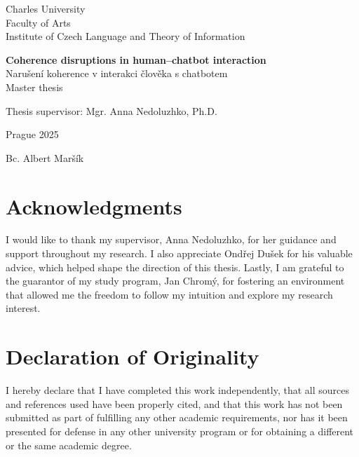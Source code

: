 \documentclass[12pt]{report}
\begin{document}
\thispagestyle{empty}

\begin{center}
    Charles University\\
    Faculty of Arts\\
    Institute of Czech Language and Theory of Information
\end{center}

\vfill

\begin{center}
    \textbf{\Large Coherence disruptions in human–chatbot interaction}\\
    Narušení koherence v interakci člověka s chatbotem\\[1cm]
    Master thesis
\end{center}

\vfill
\begin{flushleft}
    Thesis supervisor: Mgr. Anna Nedoluzhko, Ph.D.
\end{flushleft}


\noindent
\begin{minipage}{0.5\textwidth}
    Prague 2025
\end{minipage}%
\hfill
\begin{minipage}{0.4\textwidth}
    \raggedleft Bc. Albert Maršík
\end{minipage}

\newpage
\thispagestyle{empty}
\mbox{}
\newpage
\thispagestyle{empty}


   \vbox{}
   \vfill
   \section*{Acknowledgments}
   I would like to thank my supervisor, Anna Nedoluzhko, for her guidance and support throughout my research.
   I also appreciate Ondřej Dušek for his valuable advice,
   which helped shape the direction of this thesis.
   Lastly, I am grateful to the guarantor of my study program, Jan Chromý,
   for fostering an environment that allowed me the freedom to follow my intuition and explore my research interest.
   \newpage
   \thispagestyle{empty}

   \vbox{}
   \vfill
   \section*{Declaration of Originality}
   I hereby declare that I have completed this work independently,
   that all sources and references used have been properly cited,
   and that this work has not been submitted as part of fulfilling any other academic requirements,
   nor has it been presented for defense in any other university program or for obtaining a different or the same academic degree.
\end{document}
